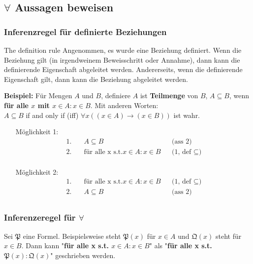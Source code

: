    \subsection{$\forall$ Aussagen beweisen}
        \subsubsection{Inferenzregel für definierte Beziehungen}

        {
            The definition rule 
        }
        {
            Angenommen, es wurde eine Beziehung definiert. Wenn die Beziehung gilt (in irgendweinem Beweisschritt oder Annahme), dann kann die definierende Eigenschaft abgeleitet werden. Andererseits, wenn die definierende Eigenschaft gilt, dann kann die Beziehung abgeleitet werden.
        }

        \textbf{Beispiel: } Für Mengen $A$ und $B$, definiere $A$ ist \textbf{Teilmenge} von $B$, $A \subseteq B$, wenn \textbf{für alle $x$ mit $x \in A : x \in B$}. Mit anderen Worten: \\ $A \subseteq B$ if and only if (iff) $\forall x ((x \in A) \rightarrow (x \in B))$ ist wahr.
        \begin{itemize}
            \item [Möglichkeit 1:]
                \begin{align*}
                    1. &\quad A \subseteq B                   && \text{(ass 2)} \\
                    2. &\quad \text{für alle x s.t.} x \in A : x \in B                      && \text{(1, def $\subseteq$)} \\
                \end{align*}
            \item [Möglichkeit 2:]
                \begin{align*}
                    1. &\quad \text{für alle x s.t.} x \in A : x \in B                      && \text{(1, def $\subseteq$)} \\
                    2. &\quad A \subseteq B                   && \text{(ass 2)} \\
                \end{align*}
        \end{itemize}

        \subsubsection*{Inferenzeregel für $\forall$}
            Sei $\mathfrak{P} $ eine Formel. Beispielsweise steht $\mathfrak{P}(x)$ für $x \in A$ und $\mathfrak{Q}(x)$ steht für $x \in B$. Dann kann "\textbf{für alle x s.t. $x \in A: x \in B$}" als "\textbf{für alle x s.t. $\mathfrak{P}(x) : \mathfrak{Q}(x)$}" geschrieben werden.
